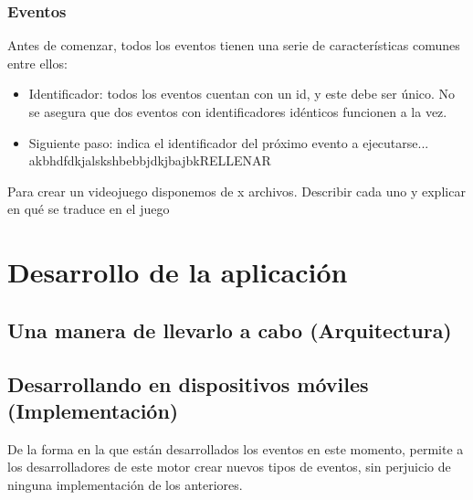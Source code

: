 \subsection{Eventos}

Antes de comenzar, todos los eventos tienen una serie de características comunes entre ellos:

\begin{itemize}
	\item Identificador: todos los eventos cuentan con un id, y este debe ser único. No se asegura que dos eventos con identificadores idénticos funcionen a la vez.
	\item Siguiente paso: indica el identificador del próximo evento a ejecutarse...
	akbhdfdkjalskshbebbjdkjbajbkRELLENAR
\end{itemize}

Para crear un videojuego disponemos de x archivos.
Describir cada uno y explicar en qué se traduce en el juego



\chapter{Desarrollo de la aplicación} \label{applicationImplementation}

\section{Una manera de llevarlo a cabo (Arquitectura)}

\section{Desarrollando en dispositivos móviles (Implementación)}

De la forma en la que están desarrollados los eventos en este momento, permite a los desarrolladores de este motor crear nuevos tipos de eventos, sin perjuicio de ninguna implementación de los anteriores.